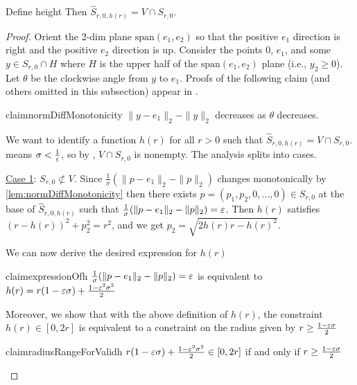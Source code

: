 \begin{lemma}
\label{lem:loss_cap}
    Define height 
    Then $\hat S_{r, 0, h(r)} = V \cap S_{r, 0}$.
\end{lemma}
\begin{proof}
    Orient the 2-dim plane $\text{span}(e_1,e_2)$ so that the positive $e_1$ direction is right and the positive $e_2$ direction is up. Consider the points 0, $e_1$, and some $y \in S_{r,0} \cap H$ where $H$ is the upper half of the $\text{span}(e_1,e_2)$ plane (i.e., $y_2 \geq 0$).  Let $\theta$ be the clockwise angle from $y$ to $e_1$. Proofs of the following claim (and others omitted in this subsection) appear in .
    \begin{restatable}{claim}{normDiffMonotonicity}
    \label{lem:normDiffMonotonicity}
    $\|y-e_1\|_2 - \|y\|_2$ decreases as $\theta$ decreases.
    \end{restatable}
    
    We want to identify a function $h(r)$ for all $r > 0$ such that $\hat S_{r, 0, h(r)} = V \cap S_{r, 0}$.  means $\sigma < \frac{1}{\varepsilon}$, so by , $V \cap S_{r,0}$ is nonempty. The analysis splits into cases.
    
    \underline{Case 1}: $S_{r,0} \not\subset V$. Since $\frac{1}{\sigma}(\|p - e_1\|_2 - \|p\|_2)$ changes monotonically by \cref{lem:normDiffMonotonicity} then there exists $p = (p_1, p_2, 0,...,0) \in S_{r,0}$ at the base of $\hat S_{r, 0, h(r)}$ such that $\frac{1}{\sigma}(\|p - e_1\|_2 - \|p\|_2) = \varepsilon$. Then $h(r)$ satisfies $(r-h(r))^2 + p_2^2 = r^2$, and we get $p_2 = \sqrt{2h(r)r - h(r)^2}$. 
    
    We can now derive the desired expression for $h(r)$ 
    \begin{restatable}{claim}{expressionOfh}
    \label{lem:expressionOfh}
    $\frac{1}{\sigma}(\|p - e_1\|_2 - \|p\|_2) = \varepsilon$ is equivalent to $h(r) = r(1-\varepsilon \sigma)  + \frac{1 - \varepsilon^2\sigma^2}{2}$
    \end{restatable}
    
    Moreover, we show that with the above definition of $h(r)$, the constraint $h(r) \in [0,2r]$ is equivalent to a constraint on the radius given by $r \geq \frac{1-\varepsilon\sigma}{2}$
    \begin{restatable}{claim}{radiusRangeForValidh}
    \label{lem:radiusRangeForValidh}
    $r(1-\varepsilon \sigma)  + \frac{1 - \varepsilon^2\sigma^2}{2} \in [0, 2r]$ if and only if $r \geq \frac{1-\varepsilon\sigma}{2}$
    \end{restatable}
    

\end{proof}
